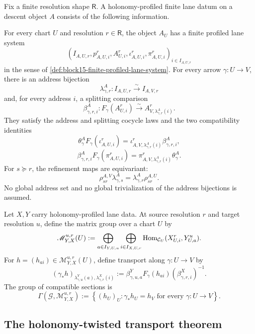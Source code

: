 \begin{definition}
\label{def:block16-holonomy-profiled-lane-datum}
Fix a finite resolution shape \(\mathsf R\).  A holonomy-profiled finite lane
datum on a descent object \(A\) consists of the following information.

For every chart \(U\) and resolution \(r\in\mathsf R\), the object \(A_U\)
has a finite profiled lane system
\[
 \left(I_{A,U,r},p^{r}_{A,U,i},A^r_{U,i},
 \iota^r_{A,U,i},\pi^r_{A,U,i}\right)_{i\in I_{A,U,r}}
\]
in the sense of \cref{def:block15-finite-profiled-lane-system}.  For every
arrow \(\gamma:U\to V\), there is an address bijection
\[
 \lambda^A_{\gamma,r}:I_{A,U,r}\xrightarrow{\sim}I_{A,V,r}
\]
and, for every address \(i\), a splitting comparison
\[
 \beta^A_{\gamma,r,i}:
 F_\gamma(A^r_{U,i})\xrightarrow{\sim}
 A^r_{V,\lambda^A_{\gamma,r}(i)}.
\]
They satisfy the address and splitting cocycle laws and the two compatibility
identities
\[
 \theta^A_\gamma F_\gamma(\iota^r_{A,U,i})
 =
 \iota^r_{A,V,\lambda^A_{\gamma,r}(i)}
 \beta^A_{\gamma,r,i},
\]
\[
 \beta^A_{\gamma,r,i}F_\gamma(\pi^r_{A,U,i})
 =
 \pi^r_{A,V,\lambda^A_{\gamma,r}(i)}\theta^A_\gamma.
\]
For \(s\succeq r\), the refinement maps are equivariant:
\[
 \rho^{A,V}_{sr}\lambda^A_{\gamma,s}
 =
 \lambda^A_{\gamma,r}\rho^{A,U}_{sr}.
\]
No global address set and no global trivialization of the address bijections is
assumed.
\end{definition}

\begin{definition}
\label{def:block16-matrix-local-system}
Let \(X,Y\) carry holonomy-profiled lane data.  At source resolution \(r\)
and target resolution \(u\), define the matrix group over a chart \(U\) by
\[
 \mathscr M^{u,r}_{Y,X}(U)
 :=
 \bigoplus_{a\in I_{Y,U,u}}
 \bigoplus_{i\in I_{X,U,r}}
 \operatorname{Hom}_{\mathcal C_U}(X^r_{U,i},Y^u_{U,a}).
\]
For \(h=(h_{ai})\in\mathscr M^{u,r}_{Y,X}(U)\), define transport along
\(\gamma:U\to V\) by
\[
 \left(\gamma_*h\right)_{
 \lambda^Y_{\gamma,u}(a),\lambda^X_{\gamma,r}(i)}
 :=
 \beta^Y_{\gamma,u,a}
 F_\gamma(h_{ai})
 \left(\beta^X_{\gamma,r,i}\right)^{-1}.
\]
The group of compatible sections is
\[
 \Gamma\!\left(\mathscr G,\mathscr M^{u,r}_{Y,X}\right)
 :=
 \left\{(h_U)_U:\gamma_*h_U=h_V
 \text{ for every }\gamma:U\to V\right\}.
\]
\end{definition}

\subsection{The holonomy-twisted transport theorem}
\label{subsec:block16-main-theorem}

